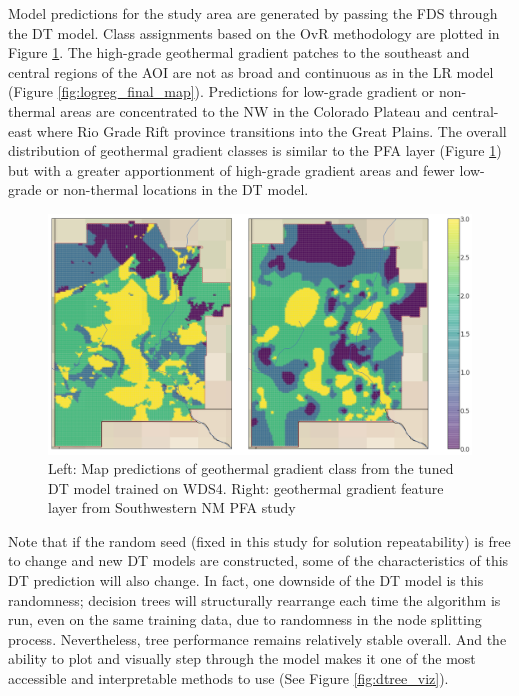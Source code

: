 Model predictions for the study area are generated by passing the FDS through the DT model. Class assignments based on the OvR methodology are plotted in Figure \ref{fig:dtree_final_map}. The high-grade geothermal gradient patches to the southeast and central regions of the AOI are not as broad and continuous as in the LR model (Figure \ref{fig:logreg_final_map}). Predictions for low-grade gradient or non-thermal areas are concentrated to the NW in the Colorado Plateau and central-east where Rio Grade Rift province transitions into the Great Plains. The overall distribution of geothermal gradient classes is similar to the \citet{bielicki_hydrogeolgic_2015} PFA layer (Figure \ref{fig:dtree_final_map}) but with a greater apportionment of high-grade gradient areas and fewer low-grade or non-thermal locations in the DT model.

\begin{figure}[!htp]
\centering
\includegraphics[width=\textwidth]{templates/images/Figure-DT-FinalMap_Joint.png}
\caption[Decision tree prediction map]{Left: Map predictions of geothermal gradient class from the tuned DT model trained on WDS4. Right: geothermal gradient feature layer from Southwestern NM PFA study \protect\citep{bielicki_hydrogeolgic_2015}}
\label{fig:dtree_final_map}
\end{figure}

Note that if the random seed (fixed in this study for solution repeatability) is free to change and new DT models are constructed, some of the characteristics of this DT prediction will also change. In fact, one downside of the DT model is this randomness; decision trees will structurally rearrange each time the algorithm is run, even on the same training data, due to randomness in the node splitting process. Nevertheless, tree performance remains relatively stable overall. And the ability to plot and visually step through the model makes it one of the most accessible and interpretable methods to use (See Figure \ref{fig:dtree_viz}).


